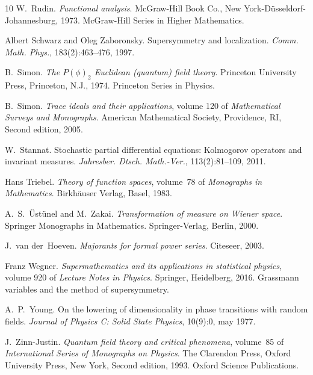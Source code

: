 \documentclass[a4paper,10pt]{article}
\newcommand{\tmtextit}[1]{{\itshape{#1}}}
\begin{document}
\begin{thebibliography}{10}
  W.~Rudin. {\newblock}\tmtextit{Functional analysis}.
  {\newblock}McGraw-Hill Book Co., New York-D{\"u}sseldorf-Johannesburg, 1973.
  {\newblock}McGraw-Hill Series in Higher Mathematics.{\newblock}
  
  Albert Schwarz  and  Oleg Zaboronsky.
  {\newblock}Supersymmetry and localization. {\newblock}\tmtextit{Comm. Math.
  Phys.}, 183(2):463--476, 1997.{\newblock}
  
  B.~Simon. {\newblock}\tmtextit{The $P (\phi)_2$
  Euclidean (quantum) field theory}. {\newblock}Princeton University Press,
  Princeton, N.J., 1974. {\newblock}Princeton Series in Physics.{\newblock}
  
  B.~Simon. {\newblock}\tmtextit{Trace ideals and their
  applications},  volume  120  of \tmtextit{Mathematical Surveys and
  Monographs}. {\newblock}American Mathematical Society, Providence, RI,
  Second  edition, 2005.{\newblock}
  
  W.~Stannat. {\newblock}Stochastic partial
  differential equations: Kolmogorov operators and invariant measures.
  {\newblock}\tmtextit{Jahresber. Dtsch. Math.-Ver.}, 113(2):81--109,
  2011.{\newblock}
  
  Hans Triebel. {\newblock}\tmtextit{Theory of function
  spaces},  volume~78  of \tmtextit{Monographs in Mathematics}.
  {\newblock}Birkh{\"a}user Verlag, Basel, 1983.{\newblock}
  
  A.~S.~{\"U}st{\"u}nel  and  M.~Zakai.
  {\newblock}\tmtextit{Transformation of measure on Wiener space}.
  {\newblock}Springer Monographs in Mathematics. Springer-Verlag, Berlin,
  2000.{\newblock}
  
  J.~van der~Hoeven.
  {\newblock}\tmtextit{Majorants for formal power series}.
  {\newblock}Citeseer, 2003.{\newblock}
  
  Franz Wegner. {\newblock}\tmtextit{Supermathematics
  and its applications in statistical physics},  volume  920  of
  \tmtextit{Lecture Notes in Physics}. {\newblock}Springer, Heidelberg, 2016.
  {\newblock}Grassmann variables and the method of supersymmetry.{\newblock}
  
  A.~P.~Young. {\newblock}On the lowering of
  dimensionality in phase transitions with random fields.
  {\newblock}\tmtextit{Journal of Physics C: Solid State Physics}, 10(9):0,
  may 1977.{\newblock}
  
  J.~Zinn-Justin. {\newblock}\tmtextit{Quantum field
  theory and critical phenomena},  volume~85  of \tmtextit{International
  Series of Monographs on Physics}. {\newblock}The Clarendon Press, Oxford
  University Press, New York, Second  edition, 1993. {\newblock}Oxford Science
  Publications.{\newblock}
\end{thebibliography}
\end{document}
